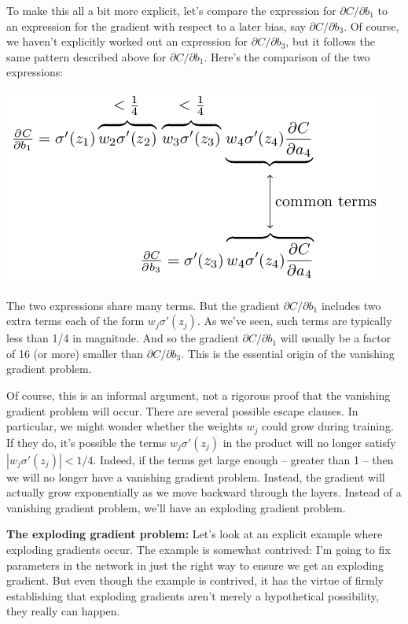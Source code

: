 \documentclass[a4paper,twoside,10pt]{book}
\begin{document}
To make this all a bit more explicit, let's compare the expression for $\partial C/\partial b_1$ to an expression for the gradient with respect to a later bias, say $\partial C/\partial b_3$. Of course, we haven't explicitly worked out an expression for $\partial C/\partial b_3$, but it follows the same pattern described above for $\partial C/\partial b_1$. Here's the comparison of the two expressions:
\begin{center}
	\includegraphics[width=0.7\linewidth]{figures/ch5/tikz39}
\end{center}
The two expressions share many terms. But the gradient $\partial C/\partial b_1$ includes two extra terms each of the form $w_j\sigma'(z_j)$. As we've seen, such terms are typically less than 1/4 in magnitude. And so the gradient $\partial C/\partial b_1$ will usually be a factor of 16 (or more) smaller than $\partial C/\partial b_3$. This is the essential origin of the vanishing gradient problem.

Of course, this is an informal argument, not a rigorous proof that the vanishing gradient problem will occur. There are several possible escape clauses. In particular, we might wonder whether the weights $w_j$ could grow during training. If they do, it's possible the terms $w_j\sigma'(z_j)$ in the product will no longer satisfy $|w_j\sigma'(z_j)|<1/4$. Indeed, if the terms get large enough -- greater than 1 -- then we will no longer have a vanishing gradient problem. Instead, the gradient will actually grow exponentially as we move backward through the layers. Instead of a vanishing gradient problem, we'll have an exploding gradient problem.

\textbf{The exploding gradient problem:} Let's look at an explicit example where exploding gradients occur. The example is somewhat contrived: I'm going to fix parameters in the network in just the right way to ensure we get an exploding gradient. But even though the example is contrived, it has the virtue of firmly establishing that exploding gradients aren't merely a hypothetical possibility, they really can happen.
\end{document}
